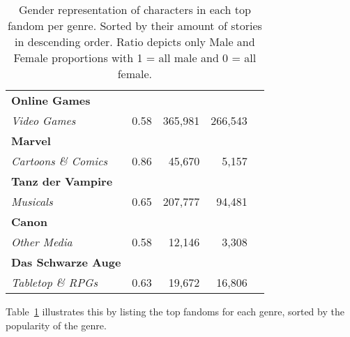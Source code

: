 \begin{table}[htb]
\begin{tabular}{lcrrr}
        \addlinespace[.2em]
        \textbf{Online Games}       & \cellcolor[HTML]{c5d8f8}                       &                              &                           \\
        \emph{Video Games}          & \multirow{-2}{*}{\cellcolor[HTML]{c5d8f8}0.58} & \multirow{-2}{*}{365,981}    & \multirow{-2}{*}{266,543} \\
        \addlinespace[.2em]
        \textbf{Marvel}             & \cellcolor[HTML]{4e84dc}                       &                              &                           \\
        \emph{Cartoons \& Comics}   & \multirow{-2}{*}{\cellcolor[HTML]{4e84dc}0.86} & \multirow{-2}{*}{45,670}     & \multirow{-2}{*}{5,157}   \\
        \addlinespace[.2em]
        \textbf{Tanz der Vampire}   & \cellcolor[HTML]{a7c3f1}                       &                              &                           \\
        \emph{Musicals}             & \multirow{-2}{*}{\cellcolor[HTML]{a7c3f1}0.65} & \multirow{-2}{*}{207,777}    & \multirow{-2}{*}{94,481}  \\
        \addlinespace[.2em]
        \textbf{Canon}              & \cellcolor[HTML]{c5d8f8}                       &                              &                           \\
        \emph{Other Media}          & \multirow{-2}{*}{\cellcolor[HTML]{c5d8f8}0.58} & \multirow{-2}{*}{12,146}     & \multirow{-2}{*}{3,308}   \\
        \addlinespace[.2em]
        \textbf{Das Schwarze Auge}  & \cellcolor[HTML]{b0c9f3}                       &                              &                           \\
        \emph{Tabletop \& RPGs}     & \multirow{-2}{*}{\cellcolor[HTML]{b0c9f3}0.63} & \multirow{-2}{*}{19,672}     & \multirow{-2}{*}{16,806}  \\
        \bottomrule
    \end{tabular}
    \caption[Gender representation of characters in top fandoms per genre.]{Gender representation of characters in each top fandom per genre. Sorted by their amount of stories in descending order. Ratio depicts only Male and Female proportions with 1 = all male and 0 = all female.}
    \label{tab:gender-representation-fandoms}
\end{table}
Table~\ref{tab:gender-representation-fandoms} illustrates this by listing the top fandoms for each genre, sorted by the popularity of the genre.

